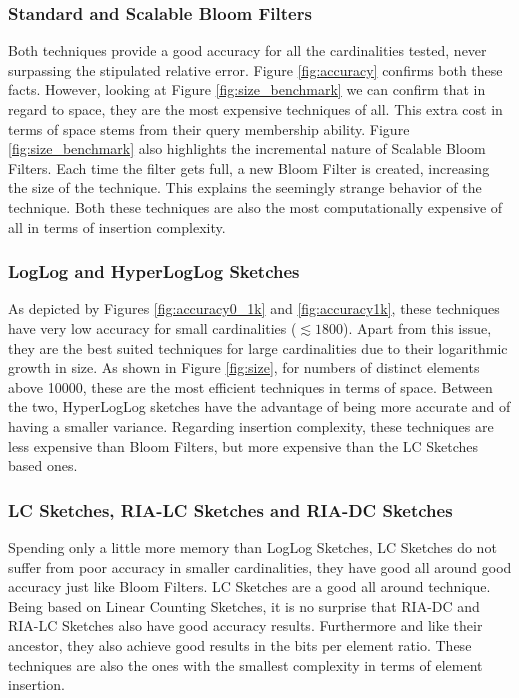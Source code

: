 \subsubsection{Standard and Scalable Bloom Filters}
Both techniques provide a good accuracy for all the cardinalities
tested, never surpassing the stipulated relative error. Figure
\ref{fig:accuracy} confirms both these facts. However, looking at
Figure \ref{fig:size_benchmark} we can confirm that in regard to
space, they are the most expensive techniques of all. This extra cost
in terms of space stems from their query membership ability. Figure
\ref{fig:size_benchmark} also highlights the incremental nature of
Scalable Bloom Filters. Each time the filter gets full, a new Bloom
Filter is created, increasing the size of the technique. This explains
the seemingly strange behavior of the technique. Both these techniques
are also the most computationally expensive of all in terms of
insertion complexity.

\subsubsection{LogLog and HyperLogLog Sketches}
As depicted by Figures \ref{fig:accuracy0_1k} and
\ref{fig:accuracy1k}, these techniques have very low accuracy for
small cardinalities ($\lesssim 1800$). Apart from this issue, they are
the best suited techniques for large cardinalities due to their
logarithmic growth in size. As shown in Figure \ref{fig:size}, for
numbers of distinct elements above 10000, these are the most efficient
techniques in terms of space. Between the two, HyperLogLog sketches have
the advantage of being more accurate and of having a smaller
variance. Regarding insertion complexity, these techniques are less
expensive than Bloom Filters, but more expensive than the LC Sketches
based ones.

\subsubsection{LC Sketches, RIA-LC Sketches and RIA-DC Sketches}
Spending only a little more memory than LogLog Sketches, LC Sketches
do not suffer from poor accuracy in smaller cardinalities, they have
good all around good accuracy just like Bloom Filters. LC Sketches are
a good all around technique. Being based on Linear Counting Sketches,
it is no surprise that RIA-DC and RIA-LC Sketches also have good
accuracy results. Furthermore and like their ancestor, they also
achieve good results in the bits per element ratio. These techniques
are also the ones with the smallest complexity in
terms of element insertion. \\

